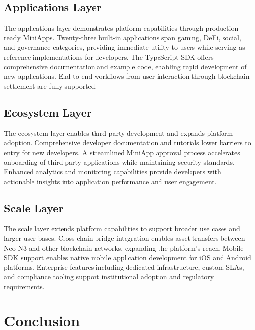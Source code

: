 \documentclass[11pt,a4paper]{article}
\begin{document}
\subsection{Applications Layer}

The applications layer demonstrates platform capabilities through production-ready MiniApps. Twenty-three built-in applications span gaming, DeFi, social, and governance categories, providing immediate utility to users while serving as reference implementations for developers. The TypeScript SDK offers comprehensive documentation and example code, enabling rapid development of new applications. End-to-end workflows from user interaction through blockchain settlement are fully supported.

\subsection{Ecosystem Layer}

The ecosystem layer enables third-party development and expands platform adoption. Comprehensive developer documentation and tutorials lower barriers to entry for new developers. A streamlined MiniApp approval process accelerates onboarding of third-party applications while maintaining security standards. Enhanced analytics and monitoring capabilities provide developers with actionable insights into application performance and user engagement.

\subsection{Scale Layer}

The scale layer extends platform capabilities to support broader use cases and larger user bases. Cross-chain bridge integration enables asset transfers between Neo N3 and other blockchain networks, expanding the platform's reach. Mobile SDK support enables native mobile application development for iOS and Android platforms. Enterprise features including dedicated infrastructure, custom SLAs, and compliance tooling support institutional adoption and regulatory requirements.

\newpage
\section{Conclusion}
\end{document}
